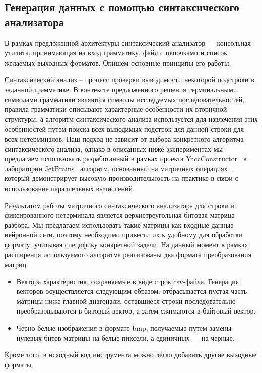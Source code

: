 \documentclass[14pt]{matmex-diploma-custom}
\begin{document}
\subsection{Генерация данных с помощью синтаксического анализатора}
В рамках предложенной архитектуры синтаксический анализатор --- консольная утилита, принимающая на вход грамматику, файл с цепочками и список желаемых выходных форматов. Опишем основные принципы его работы.

Синтаксический анализ -- процесс проверки выводимости некоторой подстроки в заданной грамматике. В контексте предложенного решения терминальными символами грамматики являются символы исследуемых последовательностей, правила грамматики описывают характерные особенности их вторичной структуры, а алгоритм синтаксического анализа используется для извлечения этих особенностей путем поиска всех выводимых подстрок для данной строки для всех нетерминалов. Наш подход не зависит от выбора конкретного алгоритма синтаксического анализа, однако в описанных ниже экспериментах мы предлагаем использовать разработанный в рамках проекта YaccConstructor~\cite{yacc} в лаборатории JetBrains~\cite{jetbrains} алгоритм, основанный на матричных операциях~\cite{Azimov:2018:CPQ:3210259.3210264}, который демонстрирует высокую производительность на практике в связи с использование параллельных вычислений.

Результатом работы матричного синтаксического анализатора для строки и фиксированного нетерминала является верхнетреугольная битовая матрица разбора. Мы предлагаем использовать такие матрицы как входные данные нейронной сети, поэтому необходимо привести их к удобному для обработки формату, учитывая специфику конкретной задачи. На данный момент в рамках расширения используемого алгоритма реализованы два формата преобразования матриц.
\begin{itemize}
    \item Вектора характеристик, сохраняемые в виде строк csv-файла. Генерация векторов осуществляется следующим образом: отбрасывается пустая часть матрицы ниже главной диагонали, оставшиеся строки последовательно преобразовываются в битовый вектор, а затем сжимаются в байтовый вектор.
    \item  Черно-белые изображения в формате bmp, получаемые путем замены нулевых битов матрицы на белые пиксели, а единичных --- на черные.
\end{itemize}
Кроме того, в исходный код инструмента можно легко добавить другие выходные форматы.
\end{document}

